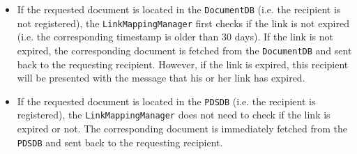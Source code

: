\documentclass[a4paper,10pt]{article}
\begin{document}
\begin{itemize}
\item
If the requested document is located in the \texttt{DocumentDB} (i.e. the recipient is not registered), the \texttt{LinkMappingManager} first checks if the link is not expired (i.e. the corresponding timestamp is older than 30 days). If the link is not expired, the corresponding document is fetched from the \texttt{DocumentDB} and sent back to the requesting recipient. However, if the link is expired, this recipient will be presented with the message that his or her link has expired.
\item
If the requested document is located in the \texttt{PDSDB} (i.e. the recipient is registered), the \texttt{LinkMappingManager} does not need to check if the link is expired or not. The corresponding document is immediately fetched from the \texttt{PDSDB} and sent back to the requesting recipient.
\end{itemize}
\end{document}
